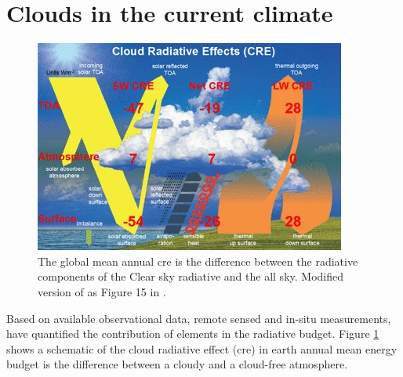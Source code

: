 \section{Clouds in the current climate} \label{sec:intro_cloud_current_climate}
\begin{figure}[h]
    \centering
    \includegraphics[scale = 7]{Chapter1_Intro/images/CRE_wild2019.jpg}
    \caption{The global mean annual \acrfull{cre} is the difference between the radiative components of the Clear sky radiative and the all sky. Modified version of as Figure 15 in \cite{Wild2019TheModels}.}
    \label{fig:cre}
\end{figure}
Based on available observational data, remote sensed and in-situ measurements, \citeauthor{Wild2019TheModels} have quantified the contribution of elements in the radiative budget. Figure \ref{fig:cre} shows a schematic of the cloud radiative effect (\acrshort{cre}) in earth annual mean energy budget is the difference between a cloudy and a cloud-free atmosphere. 

